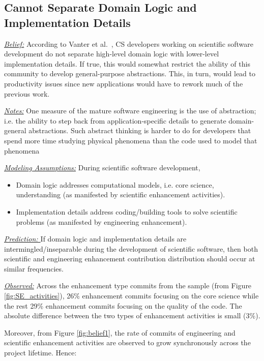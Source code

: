\documentclass[sigconf,review,anonymous]{acmart}
\newcommand{\bi}{\begin{itemize}}
\newcommand{\ei}{\end{itemize}}
\begin{document}
\subsection{Cannot Separate Domain Logic and Implementation Details} 

\noindent \textit{\underline{Belief:}} 
According to Vanter et al.~\cite{faulk09_secs},
CS developers working on scientific software development do not separate high-level domain logic with
lower-level implementation details. If true, this would somewhat restrict the ability
of this community to develop general-purpose abstractions. This, in turn, would lead
to productivity issues since new applications would have to rework much of the previous
work. 


\noindent \textit{\underline{Notes:}} One measure of the mature software engineering is the
use of abstraction; i.e. the ability to step back from application-specific
details to generate domain-general abstractions. Such abstract thinking is harder to do for developers that spend more time studying physical phenomena than the code used to model that phenomena


\noindent \textit{\underline{Modeling Assumptions:}} During scientific software development,
\bi
\item Domain logic addresses computational models, i.e. core science, understanding (as manifested by scientific enhancement activities). 
\item Implementation details address coding/building   tools   to solve scientific problems (as manifested by engineering enhancement). 
\ei


\noindent \textit{\underline{Prediction: }} If domain logic and implementation details are intermingled/inseparable during the development of scientific software, then both scientific and engineering enhancement contribution distribution should occur at similar frequencies.

\noindent \textit{\underline{Observed:}} Across the enhancement type commits from the sample (from Figure \ref{fig:SE_activities}), 26\% enhancement commits focusing on the core science while the rest 29\% enhancement commits focusing on the quality of the code. The absolute difference between the two types of enhancement activities is small (3\%). 

Moreover, from Figure \ref{fig:belief1}, the rate of commits of engineering and scientific enhancement activities are observed to grow synchronously across the project lifetime. Hence:
\end{document}
